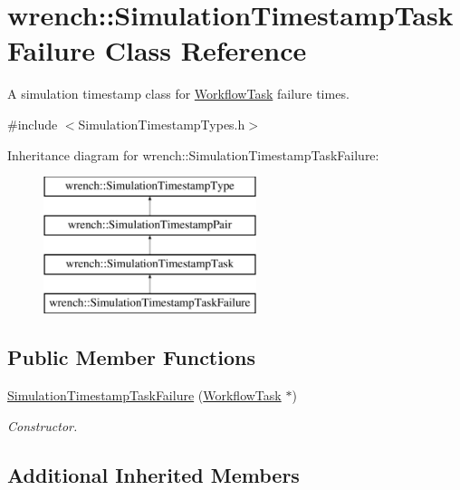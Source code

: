 \hypertarget{classwrench_1_1_simulation_timestamp_task_failure}{}\section{wrench\+:\+:Simulation\+Timestamp\+Task\+Failure Class Reference}
\label{classwrench_1_1_simulation_timestamp_task_failure}


A simulation timestamp class for \hyperlink{classwrench_1_1_workflow_task}{Workflow\+Task} failure times.  




{\ttfamily \#include $<$Simulation\+Timestamp\+Types.\+h$>$}

Inheritance diagram for wrench\+:\+:Simulation\+Timestamp\+Task\+Failure\+:\begin{figure}[H]
\begin{center}
\leavevmode
\includegraphics[height=4.000000cm]{classwrench_1_1_simulation_timestamp_task_failure}
\end{center}
\end{figure}
\subsection*{Public Member Functions}
\begin{DoxyCompactItemize}
\item 
\hyperlink{classwrench_1_1_simulation_timestamp_task_failure_a466d3e4bd70cee3c5a943e4005545d0d}{Simulation\+Timestamp\+Task\+Failure} (\hyperlink{classwrench_1_1_workflow_task}{Workflow\+Task} $\ast$)
\begin{DoxyCompactList}\small\item\em Constructor. \end{DoxyCompactList}\end{DoxyCompactItemize}
\subsection*{Additional Inherited Members}


